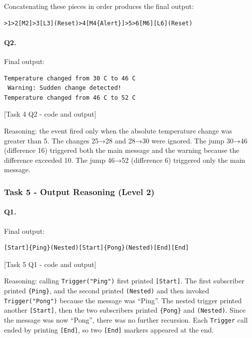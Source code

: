 Concatenating these pieces in order produces the final output:
\begin{lstlisting}
>1>2[M2]>3[L3](Reset)>4[M4{Alert}]>5>6[M6][L6](Reset)
\end{lstlisting}

\newpage

\paragraph{Q2.} Final output:
\begin{lstlisting}
Temperature changed from 30 C to 46 C
 Warning: Sudden change detected!
Temperature changed from 46 C to 52 C
\end{lstlisting}

[Task 4 Q2 - code and output]

Reasoning: the event fired only when the absolute temperature change was greater than 5. The changes 25→28 and 28→30 were ignored. The jump 30→46 (difference 16) triggered both the main message and the warning because the difference exceeded 10. The jump 46→52 (difference 6) triggered only the main message.

\newpage

\subsubsection{Task 5 - Output Reasoning (Level 2)}

\paragraph{Q1.} Final output:
\begin{lstlisting}
[Start]{Ping}(Nested)[Start]{Pong}(Nested)[End][End]
\end{lstlisting}

[Task 5 Q1 - code and output]

Reasoning: calling \texttt{Trigger("Ping")} first printed \texttt{[Start]}. The first subscriber printed \texttt{\{Ping\}}, and the second printed \texttt{(Nested)} and then invoked \texttt{Trigger("Pong")} because the message was ``Ping''. The nested trigger printed another \texttt{[Start]}, then the two subscribers printed \texttt{\{Pong\}} and \texttt{(Nested)}. Since the message was now ``Pong'', there was no further recursion. Each \texttt{Trigger} call ended by printing \texttt{[End]}, so two \texttt{[End]} markers appeared at the end.

